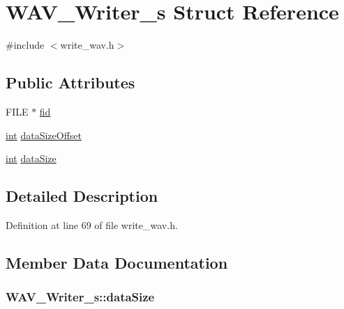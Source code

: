 \hypertarget{struct_w_a_v___writer__s}{}\section{W\+A\+V\+\_\+\+Writer\+\_\+s Struct Reference}
\label{struct_w_a_v___writer__s}


{\ttfamily \#include $<$write\+\_\+wav.\+h$>$}

\subsection*{Public Attributes}
\begin{DoxyCompactItemize}
\item 
F\+I\+LE $\ast$ \hyperlink{struct_w_a_v___writer__s_a273407f275b72472fa44a353abc3a83d}{fid}
\item 
\hyperlink{xmltok_8h_a5a0d4a5641ce434f1d23533f2b2e6653}{int} \hyperlink{struct_w_a_v___writer__s_afdd3a21bb15aef80748a23b25f7eeb07}{data\+Size\+Offset}
\item 
\hyperlink{xmltok_8h_a5a0d4a5641ce434f1d23533f2b2e6653}{int} \hyperlink{struct_w_a_v___writer__s_ab7042408b535fa561a12f7523612eb52}{data\+Size}
\end{DoxyCompactItemize}


\subsection{Detailed Description}


Definition at line 69 of file write\+\_\+wav.\+h.



\subsection{Member Data Documentation}
\subsubsection[{\texorpdfstring{data\+Size}{dataSize}}]{ W\+A\+V\+\_\+\+Writer\+\_\+s\+::data\+Size}\hypertarget{struct_w_a_v___writer__s_ab7042408b535fa561a12f7523612eb52}{}\label{struct_w_a_v___writer__s_ab7042408b535fa561a12f7523612eb52}


